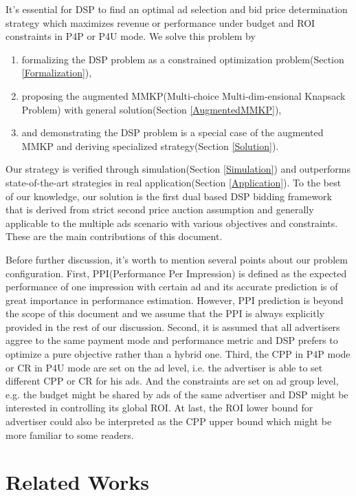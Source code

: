 \documentclass[sigconf]{acmart}
\begin{document}
It's essential for DSP to find an optimal ad selection and bid price determination strategy
    which maximizes revenue or performance under budget and ROI constraints in P4P or P4U mode.
We solve this problem by

\begin{enumerate}
\item formalizing the DSP problem as a constrained optimization problem(Section \ref{Formalization}),
\item proposing the augmented MMKP(Multi-choice Multi-dim-ensional Knapsack Problem) with general solution(Section \ref{AugmentedMMKP}),
\item and demonstrating the DSP problem is a special case of the augmented MMKP and deriving specialized strategy(Section \ref{Solution}).
\end{enumerate}

Our strategy is verified through simulation(Section \ref{Simulation}) and
    outperforms state-of-the-art strategies in real application(Section \ref{Application}).
To the best of our knowledge, our solution is the first dual based DSP bidding framework
    that is derived from strict second price auction assumption and
    generally applicable to the multiple ads scenario with various objectives and constraints.
These are the main contributions of this document.

Before further discussion, it's worth to mention several points about our problem configuration.
First, PPI(Performance Per Impression) is defined as the expected performance of one impression with certain ad
    and its accurate prediction is of great importance in performance estimation.
However, PPI prediction is beyond the scope of this document
    and we assume that the PPI is always explicitly provided in the rest of our discussion.
Second, it is assumed that all advertisers aggree to the same payment mode and performance metric
    and DSP prefers to optimize a pure objective rather than a hybrid one.
Third, the CPP in P4P mode or CR in P4U mode are set on the ad level,
    i.e. the advertiser is able to set different CPP or CR for his ads.
And the constraints are set on ad group level,
    e.g. the budget might be shared by ads of the same advertiser
    and DSP might be interested in controlling its global ROI.
At last, the ROI lower bound for advertiser could also be interpreted as the CPP upper bound
    which might be more familiar to some readers.

\section{Related Works}
\end{document}
